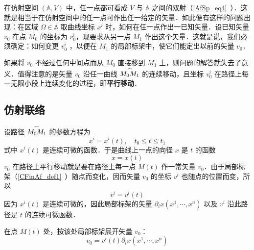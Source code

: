 
在仿射空间 $(\mathbb A,V)$ 中，任一点都可看成 $V$ 与 $\mathbb A$ 之间的双射（\autoref{AfSp_eq4}~）．这就是相当于在仿射空间中的任一点可作出任一给定的矢量．如此便有这样的问题出现：在区域 $\Omega\in\mathbb A$ 取曲线坐标 $x^i$ 时，如何在任一点作出一已知矢量．设已知矢量 $v_0$ 在点 $M_0$ 的坐标为 $v_0^i$，现要求从另一点 $M_1$ 作出这个矢量．这就是说，我们必须确定：如何变更 $v_0^i$ ，以便在 $M_1$ 的局部标架中，使它们能定出以前的矢量 $v_0$．

如果将 $v_0$ 不经过任何中间点而从 $M_0$ 直接移到 $M_1$ 上，则问题的解答就失去了意义．值得注意的是矢量 $v_0$ 沿任一曲线 $\overset{\Huge\frown}{M_0M_1}$ 的连续移动，且坐标 $v_0^i$ 在路径上每一无限小段上连续变化的过程，即\textbf{平行移动}．
\subsection{仿射联络}
设路径 $\overset{\Huge\frown}{M_0M_1}$ 的参数方程为
\begin{equation}
x^i=x^i(t),\quad t_0\leq t\leq t_1
\end{equation}
式中 $x^i(t)$ 是连续可微的函数．于是曲线上一点的向径 $x$ 是 $t$ 的函数
\begin{equation}
x=x(t)
\end{equation}
$v_0$ 在路径上平行移动就是要在路径上每一点 $M(t)$ 作一常矢量 $v_0$．由于局部标架（\autoref{CFinAf_def1}~）随点而变化，因而矢量 $v_0$ 的坐标 $v^i$ 也随点的位置而变，所以
\begin{equation}
v^i=v^i(t)
\end{equation}
因为 $x^i(t)$ 是连续可微的，因此局部标架的矢量 $\partial_i x(x^1,\cdots,x^n)$ 以及 $v^i$ 沿此路径是 $t$ 的连续可微函数．

在点 $M(t)$ 处，按该处局部标架展开矢量 $v_0$：
\begin{equation}
v_0=v^i(t)\partial_i x(x^1,\cdots,x^n)
\end{equation}
